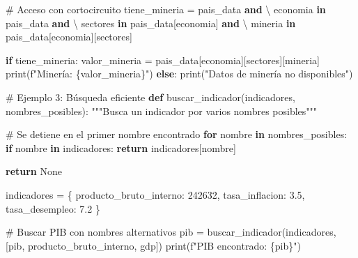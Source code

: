 \documentclass[
  doc,
  floatsintext,
  longtable,
  a4paper,
  nolmodern,
  notxfonts,
  notimes,
  12pt,
  colorlinks=true,linkcolor=blue,citecolor=blue,urlcolor=blue]{apa7}
\newenvironment{Shaded}{\begin{snugshade}}{\end{snugshade}}
\newcommand{\BuiltInTok}[1]{\textcolor[rgb]{0.00,0.23,0.31}{#1}}
\newcommand{\CommentTok}[1]{\textcolor[rgb]{0.37,0.37,0.37}{#1}}
\newcommand{\ControlFlowTok}[1]{\textcolor[rgb]{0.00,0.23,0.31}{\textbf{#1}}}
\newcommand{\DecValTok}[1]{\textcolor[rgb]{0.68,0.00,0.00}{#1}}
\newcommand{\FloatTok}[1]{\textcolor[rgb]{0.68,0.00,0.00}{#1}}
\newcommand{\KeywordTok}[1]{\textcolor[rgb]{0.00,0.23,0.31}{\textbf{#1}}}
\newcommand{\NormalTok}[1]{\textcolor[rgb]{0.00,0.23,0.31}{#1}}
\newcommand{\OperatorTok}[1]{\textcolor[rgb]{0.37,0.37,0.37}{#1}}
\newcommand{\SpecialCharTok}[1]{\textcolor[rgb]{0.37,0.37,0.37}{#1}}
\newcommand{\SpecialStringTok}[1]{\textcolor[rgb]{0.13,0.47,0.30}{#1}}
\newcommand{\StringTok}[1]{\textcolor[rgb]{0.13,0.47,0.30}{#1}}
\newcommand{\VariableTok}[1]{\textcolor[rgb]{0.07,0.07,0.07}{#1}}
\begin{document}
\begin{Shaded}
\begin{Highlighting}[]
\CommentTok{\# Acceso con cortocircuito}
\NormalTok{tiene\_mineria }\OperatorTok{=}\NormalTok{ pais\_data }\KeywordTok{and} \OperatorTok{\textbackslash{}}
                \StringTok{\textquotesingle{}economia\textquotesingle{}} \KeywordTok{in}\NormalTok{ pais\_data }\KeywordTok{and} \OperatorTok{\textbackslash{}}
                \StringTok{\textquotesingle{}sectores\textquotesingle{}} \KeywordTok{in}\NormalTok{ pais\_data[}\StringTok{\textquotesingle{}economia\textquotesingle{}}\NormalTok{] }\KeywordTok{and} \OperatorTok{\textbackslash{}}
                \StringTok{\textquotesingle{}mineria\textquotesingle{}} \KeywordTok{in}\NormalTok{ pais\_data[}\StringTok{\textquotesingle{}economia\textquotesingle{}}\NormalTok{][}\StringTok{\textquotesingle{}sectores\textquotesingle{}}\NormalTok{]}

\ControlFlowTok{if}\NormalTok{ tiene\_mineria:}
\NormalTok{    valor\_mineria }\OperatorTok{=}\NormalTok{ pais\_data[}\StringTok{\textquotesingle{}economia\textquotesingle{}}\NormalTok{][}\StringTok{\textquotesingle{}sectores\textquotesingle{}}\NormalTok{][}\StringTok{\textquotesingle{}mineria\textquotesingle{}}\NormalTok{]}
    \BuiltInTok{print}\NormalTok{(}\SpecialStringTok{f"Minería: }\SpecialCharTok{\{}\NormalTok{valor\_mineria}\SpecialCharTok{\}}\SpecialStringTok{"}\NormalTok{)}
\ControlFlowTok{else}\NormalTok{:}
    \BuiltInTok{print}\NormalTok{(}\StringTok{"Datos de minería no disponibles"}\NormalTok{)}

\CommentTok{\# Ejemplo 3: Búsqueda eficiente}
\KeywordTok{def}\NormalTok{ buscar\_indicador(indicadores, nombres\_posibles):}
    \CommentTok{"""Busca un indicador por varios nombres posibles"""}
    
    \CommentTok{\# Se detiene en el primer nombre encontrado}
    \ControlFlowTok{for}\NormalTok{ nombre }\KeywordTok{in}\NormalTok{ nombres\_posibles:}
        \ControlFlowTok{if}\NormalTok{ nombre }\KeywordTok{in}\NormalTok{ indicadores:}
            \ControlFlowTok{return}\NormalTok{ indicadores[nombre]}
    
    \ControlFlowTok{return} \VariableTok{None}

\NormalTok{indicadores }\OperatorTok{=}\NormalTok{ \{}
    \StringTok{\textquotesingle{}producto\_bruto\_interno\textquotesingle{}}\NormalTok{: }\DecValTok{242632}\NormalTok{,}
    \StringTok{\textquotesingle{}tasa\_inflacion\textquotesingle{}}\NormalTok{: }\FloatTok{3.5}\NormalTok{,}
    \StringTok{\textquotesingle{}tasa\_desempleo\textquotesingle{}}\NormalTok{: }\FloatTok{7.2}
\NormalTok{\}}

\CommentTok{\# Buscar PIB con nombres alternativos}
\NormalTok{pib }\OperatorTok{=}\NormalTok{ buscar\_indicador(indicadores, [}\StringTok{\textquotesingle{}pib\textquotesingle{}}\NormalTok{, }\StringTok{\textquotesingle{}producto\_bruto\_interno\textquotesingle{}}\NormalTok{, }\StringTok{\textquotesingle{}gdp\textquotesingle{}}\NormalTok{])}
\BuiltInTok{print}\NormalTok{(}\SpecialStringTok{f"PIB encontrado: }\SpecialCharTok{\{}\NormalTok{pib}\SpecialCharTok{\}}\SpecialStringTok{"}\NormalTok{)}
\end{Highlighting}
\end{Shaded}
\end{document}
